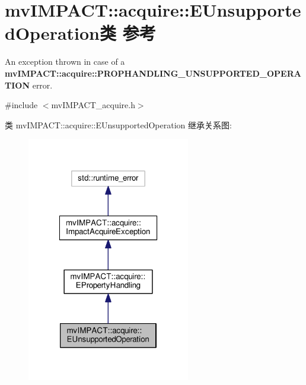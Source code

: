 \hypertarget{classmv_i_m_p_a_c_t_1_1acquire_1_1_e_unsupported_operation}{\section{mv\+I\+M\+P\+A\+C\+T\+:\+:acquire\+:\+:E\+Unsupported\+Operation类 参考}
\label{classmv_i_m_p_a_c_t_1_1acquire_1_1_e_unsupported_operation}
}


An exception thrown in case of a {\bfseries mv\+I\+M\+P\+A\+C\+T\+::acquire\+::\+P\+R\+O\+P\+H\+A\+N\+D\+L\+I\+N\+G\+\_\+\+U\+N\+S\+U\+P\+P\+O\+R\+T\+E\+D\+\_\+\+O\+P\+E\+R\+A\+T\+I\+O\+N} error.  




{\ttfamily \#include $<$mv\+I\+M\+P\+A\+C\+T\+\_\+acquire.\+h$>$}



类 mv\+I\+M\+P\+A\+C\+T\+:\+:acquire\+:\+:E\+Unsupported\+Operation 继承关系图\+:
\nopagebreak
\begin{figure}[H]
\begin{center}
\leavevmode
\includegraphics[width=202pt]{classmv_i_m_p_a_c_t_1_1acquire_1_1_e_unsupported_operation__inherit__graph}
\end{center}
\end{figure}


